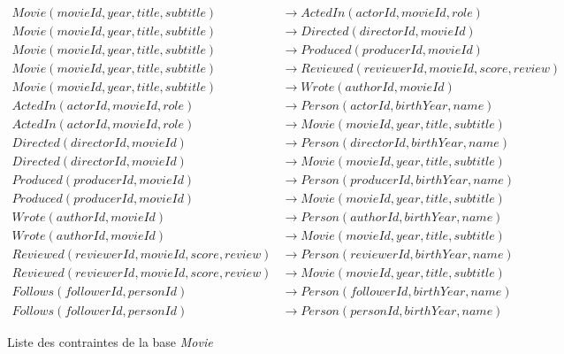 \begin{figure}[H]
    \centering
    \begin{adjustbox}{max width=\linewidth,max height=.5\textheight}
        \parbox{\linewidth}{\begin{align*}
            Movie(movieId, year, title, subtitle) &\to ActedIn(actorId, movieId, role) \\
            Movie(movieId, year, title, subtitle) &\to Directed(directorId, movieId) \\
            Movie(movieId, year, title, subtitle) &\to Produced(producerId, movieId) \\
            Movie(movieId, year, title, subtitle) &\to Reviewed(reviewerId, movieId, score, review) \\
            Movie(movieId, year, title, subtitle) &\to Wrote(authorId, movieId) \\
            ActedIn(actorId, movieId, role) &\to Person(actorId, birthYear, name) \\
            ActedIn(actorId, movieId, role) &\to Movie(movieId, year, title, subtitle) \\
            Directed(directorId, movieId) &\to Person(directorId, birthYear, name) \\
            Directed(directorId, movieId) &\to Movie(movieId, year, title, subtitle) \\
            Produced(producerId, movieId) &\to Person(producerId, birthYear, name) \\
            Produced(producerId, movieId) &\to Movie(movieId, year, title, subtitle) \\
            Wrote(authorId, movieId) &\to Person(authorId, birthYear, name) \\
            Wrote(authorId, movieId) &\to Movie(movieId, year, title, subtitle) \\
            Reviewed(reviewerId, movieId, score, review) &\to Person(reviewerId, birthYear, name) \\
            Reviewed(reviewerId, movieId, score, review) &\to Movie(movieId, year, title, subtitle) \\
            Follows(followerId, personId) &\to Person(followerId, birthYear, name) \\
            Follows(followerId, personId) &\to Person(personId, birthYear, name)
        \end{align*}}
    \end{adjustbox}
    \caption{Liste des contraintes de la base \textit{Movie}}
\end{figure}

